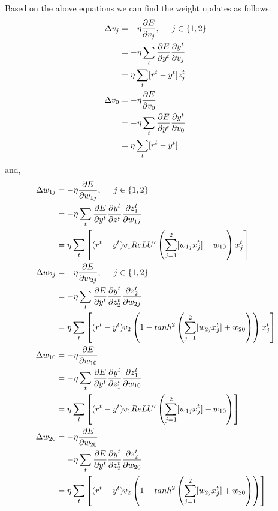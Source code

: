 Based on the above equations we can find the weight updates as follows:
\begin{equation}
	\begin{split}
		\Delta v_j 	&= - \eta \frac{\partial E}{\partial v_j},\hspace*{0.5cm} j\in \{1,2\}\\
					&= -\eta \sum_{t} \frac{\partial E}{\partial y^t} \frac{\partial y^t}{\partial v_j}\\
					&= \eta \sum_{t} [r^t - y^t]z_j^t\\
		\Delta v_0	&= - \eta \frac{\partial E}{\partial v_0}\\
					&= -\eta \sum_{t} \frac{\partial E}{\partial y^t} \frac{\partial y^t}{\partial v_0}\\
					&= \eta \sum_{t} [r^t - y^t]\\
	\end{split}
\end{equation}
and,
\begin{equation}\label{eq:w_update}
	\begin{split}
		\Delta w_{1j} 	&= - \eta \frac{\partial E}{\partial w_{1j}},\hspace*{0.5cm} j\in \{1,2\}\\
						&= -\eta \sum_{t} \frac{\partial E}{\partial y^t} \frac{\partial y^t}{\partial z_1^t} \frac{\partial z_1^t}{\partial w_{1j}}\\
						&= \eta \sum_{t}\left[ (r^t-y^t)v_1ReLU'\left(\sum_{j=1}^{2}[w_{1j}x_j^t]+w_{10}\right)x_j^t\right]\\
		\Delta w_{2j} 	&= - \eta \frac{\partial E}{\partial w_{2j}},\hspace*{0.5cm} j\in \{1,2\}\\
						&= -\eta \sum_{t} \frac{\partial E}{\partial y^t} \frac{\partial y^t}{\partial z_2^t} \frac{\partial z_2^t}{\partial w_{2j}}\\
						&= \eta \sum_{t}\left[ (r^t-y^t)v_2\left(1-tanh^2\left(\sum_{j=1}^{2}[w_{2j}x_j^t]+w_{20}\right)\right)x_j^t\right]\\
		\Delta w_{10}	&= - \eta \frac{\partial E}{\partial w_{10}}\\
						&= -\eta \sum_{t} \frac{\partial E}{\partial y^t} \frac{\partial y^t}{\partial z_1^t} \frac{\partial z_1^t}{\partial w_{10}}\\
						&= \eta \sum_{t}\left[ (r^t-y^t)v_1ReLU'\left(\sum_{j=1}^{2}[w_{1j}x_j^t]+w_{10}\right)\right]\\
		\Delta w_{20}	&=  - \eta \frac{\partial E}{\partial w_{20}}\\
						&= -\eta \sum_{t} \frac{\partial E}{\partial y^t} \frac{\partial y^t}{\partial z_2^t} \frac{\partial z_2^t}{\partial w_{20}}\\
						&= \eta \sum_{t}\left[ (r^t-y^t)v_2\left(1-tanh^2\left(\sum_{j=1}^{2}[w_{2j}x_j^t]+w_{20}\right)\right)\right]
	\end{split}
\end{equation}

